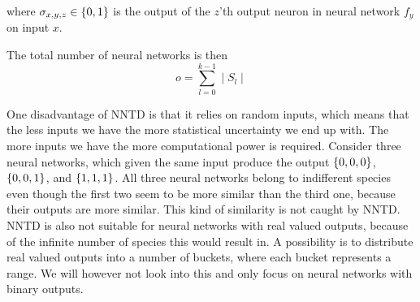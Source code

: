 where $\sigma_{x,y,z} \in \{ 0, 1 \}$ is the output of the $z$'th output neuron in neural network $f_y$ on input $x$.

The total number of neural networks is then
%
\[
  o = \sum\limits_{l = 0}^{k-1} \mid S_l \mid
\]
%

One disadvantage of NNTD is that it relies on random inputs, which means that the less inputs we have the more statistical uncertainty we end up with. The more inputs we have the more computational power is required. Consider three neural networks, which given the same input produce the output $\{ 0, 0, 0 \}$, $\{ 0, 0, 1 \}$, and $\{ 1, 1, 1 \}$. All three neural networks belong to indifferent species even though the first two seem to be more similar than the third one, because their outputs are more similar. This kind of similarity is not caught by NNTD\@. NNTD is also not suitable for neural networks with real valued outputs, because of the infinite number of species this would result in. A possibility is to distribute real valued outputs into a number of buckets, where each bucket represents a range. We will however not look into this and only focus on neural networks with binary outputs.
